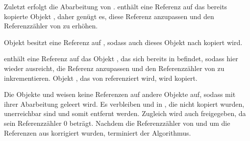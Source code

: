 Zuletzt erfolgt die Abarbeitung von .
 enthält eine Referenz auf das bereits kopierte Objekt , daher genügt es, diese Referenz anzupassen und den Referenzzähler von  zu erhöhen.

\begin{center}
	
\end{center}

Objekt  besitzt eine Referenz auf , sodass auch dieses Objekt nach \Mature kopiert wird.

\begin{center}
	
\end{center}

 enthält eine Referenz auf das Objekt , das sich bereits in \Mature befindet, sodass hier wieder ausreicht, die Referenz anzupassen und den Referenzzähler von  zu inkrementieren.
Objekt , das von  referenziert wird, wird kopiert.

\begin{center}
	
\end{center}

Die Objekte  und  weisen keine Referenzen auf andere Objekte auf, sodass mit ihrer Abarbeitung  geleert wird.
Es verbleiben  und  in \Nursery, die nicht kopiert wurden, unerreichbar sind und somit entfernt werden.
Zugleich wird auch  freigegeben, da sein Referenzzähler $0$ beträgt.
Nachdem die Referenzzähler von  und  um die Referenzen aus \Roots korrigiert wurden, terminiert der Algorithmus.

\begin{center}
	
\end{center}